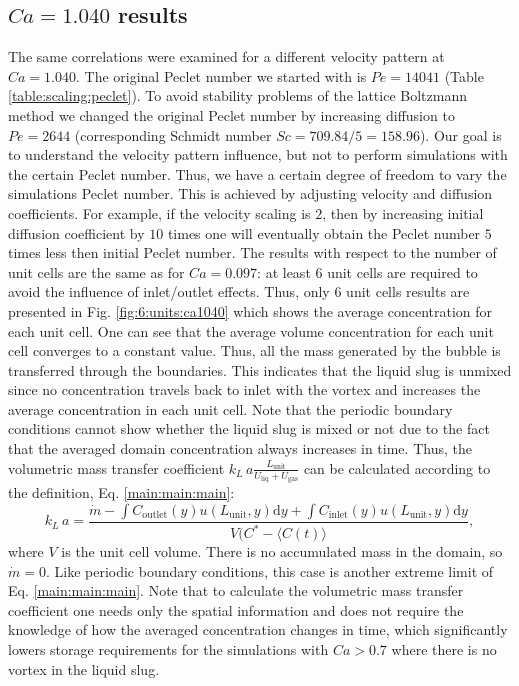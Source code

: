 \documentclass[review,12pt]{elsarticle}
\newcommand{\beq}{\begin{equation}}
\newcommand{\feq}{\end{equation}}
\newcommand{\vol}{k_L\,a}
\newcommand{\lunit}{L_{\mathrm{unit}}}
\newcommand{\ububble}{U_{\mathrm{bubble}}}
\newcommand{\uliq}{U_{\mathrm{liq}}}
\newcommand{\ugas}{U_{\mathrm{gas}}}
\newcommand{\cinlet}{C_{\mathrm{inlet}}}
\newcommand{\coutlet}{C_{\mathrm{outlet}}}
\newcommand{\cstar}{C^{*}}
\newcommand{\volnondim}{\vol \frac{\lunit}{\uliq+\ugas}}
\begin{document}
\subsection{$Ca=1.040$ results}
The same correlations were examined for a different velocity pattern at $Ca=1.040$. %
The original Peclet number we started with is $Pe=14041$ (Table \ref{table:scaling:peclet}).
To avoid stability problems of the lattice Boltzmann method we changed the original Peclet number by increasing
diffusion to $Pe=2644$ (corresponding Schmidt number $Sc=709.84/5=158.96$). {\color{red} Our goal is to understand the velocity pattern influence, but not to perform simulations with the certain Peclet number. Thus, we have a certain degree of freedom to vary the simulations Peclet number. This is achieved by adjusting velocity and diffusion coefficients. For example, if the velocity scaling is $2$, then by increasing initial diffusion coefficient by $10$ times one will eventually obtain the Peclet number $5$ times less then initial Peclet number. } The results with respect to the number of unit cells are the same as for $Ca=0.097$:
at least $6$ unit cells are required to avoid the influence of inlet/outlet effects. Thus,
only $6$ unit cells results are presented in Fig. \ref{fig:6:units:ca1040} which shows the
average concentration for each unit cell. One can see that the average volume concentration for each unit cell converges to
a constant value. Thus, all the
mass generated by the bubble is transferred through the boundaries. This indicates that the
liquid slug is unmixed since no concentration travels back to inlet with the vortex and increases the average concentration in each unit cell. Note that the periodic boundary conditions cannot show whether the
liquid slug is mixed or not due to the fact that the averaged domain concentration always increases in time. 
Thus, the volumetric mass transfer coefficient $\volnondim$ can be calculated according to the
definition, Eq. \ref{main:main:main}:
\beq
\label{inlet:outlet:spatial:location}
\vol =
\frac{\dot{m}-\int{\coutlet(y)u(\lunit,y)\mathrm{d}y}+\int{\cinlet(y)u(\lunit,y)\mathrm{d}y}}{V
(\cstar - \langle C(t) \rangle},
\feq 
where $V$ is the unit cell volume. There is no accumulated mass in the domain, so $\dot{m}=0$. Like periodic boundary
conditions, this case is another extreme limit of Eq. \ref{main:main:main}. Note that to calculate
the volumetric mass transfer coefficient one needs only the spatial information and does not
require the knowledge of how the averaged concentration changes in time, which significantly
lowers storage requirements for the simulations with $Ca>0.7$ where there is no vortex in the
liquid slug. 
\end{document}
